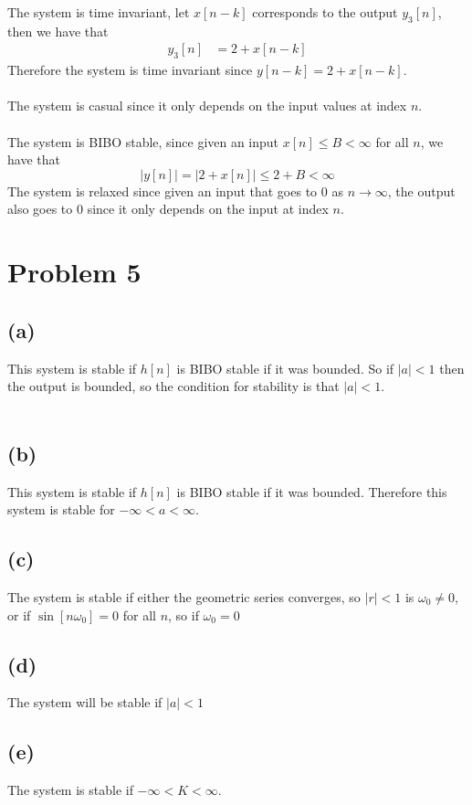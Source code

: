 The system is time invariant, let $x[n-k]$ corresponds to the output $y_3[n]$, then we have that
\begin{align*}
    y_3[n]&=2+x[n-k]
\end{align*}
Therefore the system is time invariant since $y[n-k]=2+x[n-k]$.\\\\
The system is casual since it only depends on the input values at index $n$.\\\\
The system is BIBO stable, since given an input $x[n]\leq B<\infty$ for all $n$, we have that
$$|y[n]|=|2+x[n]|\leq 2+B < \infty$$
The system is relaxed since given an input that goes to $0$ as $n\to\infty$, the output
also goes to $0$ since it only depends on the input at index $n$.
\section*{Problem 5}
\subsection*{(a)}

This system is stable if $h[n]$ is BIBO stable if it was bounded.
So if $|a|<1$ then the output is bounded, so
the condition for stability is that $\boxed{|a|<1}$.\\\\
\subsection*{(b)}

This system is stable if $h[n]$ is BIBO stable if it was bounded. Therefore this system is stable for $\boxed{-\infty<a<\infty}$.
\subsection*{(c)}
The system is stable if either the geometric series converges, so $\boxed{|r|<1}$ is $\boxed{\omega_0\neq0}$, or 
if $\sin[n\omega_0]=0$ for all $n$, so if $\boxed{\omega_0=0}$
\subsection*{(d)}
The system will be stable if $\boxed{|a|<1}$
\subsection*{(e)}
The system is stable if $-\infty<K<\infty$.

